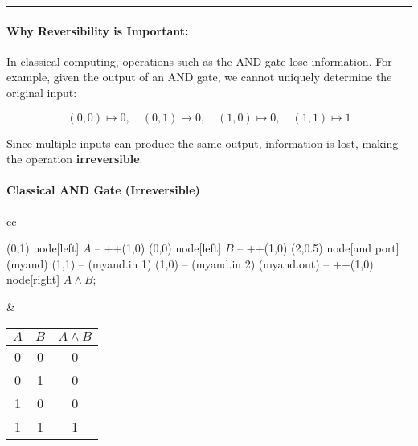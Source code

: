 \vspace{0.3cm}

\noindent\rule{\linewidth}{0.2pt}

\vspace{0.3cm}


\paragraph{Why Reversibility is Important:}
In classical computing, operations such as the AND gate lose information.
For example, given the output of an AND gate, we cannot uniquely determine
the original input:

\[
  (0,0) \mapsto 0, \quad (0,1) \mapsto 0, \quad (1,0) \mapsto 0, \quad
  (1,1) \mapsto 1
\]

Since multiple inputs can produce the same output, information is lost,
making the operation \textbf{irreversible}.

\paragraph{Classical AND Gate (Irreversible)}
\begin{center}
  \begin{tabular}{cc}
    \begin{circuitikz} \draw
      (0,1) node[left] {$A$} -- ++(1,0)
      (0,0) node[left] {$B$} -- ++(1,0)
      (2,0.5) node[and port] (myand) {}
      (1,1) -- (myand.in 1)
      (1,0) -- (myand.in 2)
      (myand.out) -- ++(1,0) node[right] {$A \land B$};
    \end{circuitikz}
    &
    \begin{tabular}{|c|c|c|}
      \hline
      $A$ & $B$ & $A \land B$ \\
      \hline
      0 & 0 & 0 \\
      0 & 1 & 0 \\
      1 & 0 & 0 \\
      1 & 1 & 1 \\
      \hline
    \end{tabular}
  \end{tabular}
\end{center}

